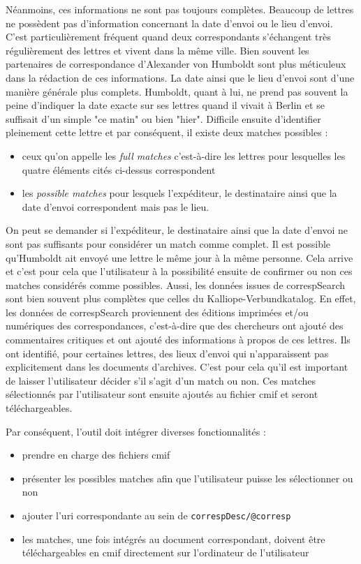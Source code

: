\documentclass[a4paper, 12pt, twoside]{book}
\begin{document}
Néanmoins, ces informations ne sont pas toujours complètes. Beaucoup de lettres ne possèdent pas d'information concernant la date d'envoi ou le lieu d'envoi. C'est particulièrement fréquent quand deux correspondants s'échangent très régulièrement des lettres et vivent dans la même ville. Bien souvent les partenaires de correspondance d'Alexander von Humboldt sont plus méticuleux dans la rédaction de ces informations. La date ainsi que le lieu d'envoi sont d'une manière générale plus complets. Humboldt, quant à lui, ne prend pas souvent la peine d'indiquer la date exacte sur ses lettres quand il vivait à Berlin et se suffisait d'un simple "ce matin" ou bien "hier". Difficile ensuite d'identifier pleinement cette lettre et par conséquent, il existe deux matches possibles : 
\begin{itemize}
    \item ceux qu'on appelle les \textit{full matches} c'est-à-dire les lettres pour lesquelles les quatre éléments cités ci-dessus correspondent
    \item les \textit{possible matches} pour lesquels l'expéditeur, le destinataire ainsi que la date d'envoi correspondent mais pas le lieu.
\end{itemize}
On peut se demander si l'expéditeur, le destinataire ainsi que la date d'envoi ne sont pas suffisants pour considérer un match comme complet. Il est possible qu'Humboldt ait envoyé une lettre le même jour à la même personne. Cela arrive et c'est pour cela que l'utilisateur à la possibilité ensuite de confirmer ou non ces matches considérés comme possibles. Aussi, les données issues de correspSearch sont bien souvent plus complètes que celles du Kalliope-Verbundkatalog. En effet, les données de correspSearch proviennent des éditions imprimées et/ou numériques des correspondances, c'est-à-dire que des chercheurs ont ajouté des commentaires critiques et ont ajouté des informations à propos de ces lettres. Ils ont identifié, pour certaines lettres, des lieux d'envoi qui n'apparaissent pas explicitement dans les documents d'archives. C'est pour cela qu'il est important de laisser l'utilisateur décider s'il s'agit d'un match ou non. Ces matches sélectionnés par l'utilisateur sont ensuite ajoutés au fichier \gls{cmif} et seront téléchargeables. 

Par conséquent, l'outil doit intégrer diverses fonctionnalités :
\begin{itemize}
    \item prendre en charge des fichiers \gls{cmif}
    \item présenter les possibles matches afin que l'utilisateur puisse les sélectionner ou non
    \item ajouter l'\gls{uri} correspondante au sein de \texttt{correspDesc/@corresp}
    \item les matches, une fois intégrés au document correspondant, doivent être téléchargeables en \gls{cmif} directement sur l'ordinateur de l'utilisateur
\end{itemize}
\end{document}
